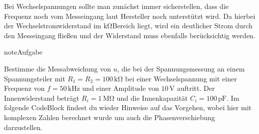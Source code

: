 \documentclass[letterpaper,10pt,english]{jupyterBook}
\begin{document}
\sphinxAtStartPar
Bei Wechselspannungen sollte man zunächst immer sicherstellen, dass die Frequenz noch vom Messeingang laut Hersteller noch unterstützt wird. Da hierbei der Wechselstromwiderstand im \(\mathrm{k\Omega}\)\sphinxhyphen{}Bereich liegt, wird ein deutlicher Strom durch den Messeingang fließen und der Widerstand muss ebenfalls berücksichtig werden.

\begin{sphinxadmonition}{note}{Aufgabe}

\sphinxAtStartPar
Bestimme die Messabweichung von \(u\), die bei der Spannungsmessung an einem Spannungsteiler mit \(R_1 = R_2 = 100\,\mathrm{k\Omega}\) bei einer Wechselspannung mit einer Frequenz von \(f = 50\,\mathrm{kHz}\) und einer Amplitude von \(10\,\mathrm V\) auftritt. Der Innenwiderstand beträgt \(R_i = 1\,\mathrm{M\Omega}\) und die Innenkapazität \(C_i = 100\,\mathrm{pF}\). Im folgende Code\sphinxhyphen{}Block findest du wieder Hinweise auf das Vorgehen, wobei hier mit komplexen Zahlen berechnet wurde um auch die Phasenverschiebung darzustellen.
\end{sphinxadmonition}
\end{document}
